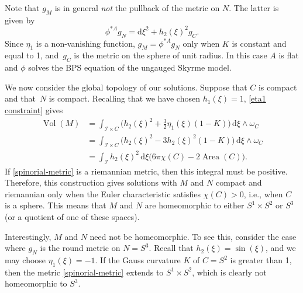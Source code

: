 \documentclass[10pt,a4paper]{amsart}
\newcommand{\II}{{\mathcal{I}}}
\newcommand{\1}{{\mathbb{1}}}
\def \d{\mathrm{d}}
\numberwithin{equation}{section}
\begin{document}
Note that $g_M$ is in general \emph{not} the pullback of the metric on $N$. The latter is given by
\begin{equation*}
\phi^{\ast A}g_N = \d\xi^2 + h_2(\xi)^{2}g_C.
\end{equation*}
Since $\eta_1$ is a non-vanishing function, $g_M=\phi^{\ast A} g_N$ only when $K$ is constant and equal to 1, and~$g_C$ is the metric on the sphere of unit radius. In this case $A$ is flat and $\phi$ solves the BPS equation of the ungauged Skyrme model.

We now consider the global topology of our solutions. Suppose that $C$ is compact and that~$N$ is compact. Recalling that we have chosen $h_1(\xi)=1$, \eqref{eta1 constraint} gives
\begin{equation*}
\begin{aligned}
\operatorname{Vol}(M)&=
\int_{\II\times C}\bigl(h_2(\xi)^{2}+\tfrac32\eta_1(\xi)(1-K)\bigr)\,\d\xi\wedge\omega_C \\
&= \int_{\II\times C}\bigl(h_2(\xi)^{2}-3h_2(\xi)^2(1-K)\bigr)\,\d\xi\wedge\omega_C \\
&= \int_{\II}h_2(\xi)^{2}\,\d\xi\bigl(6\pi\chi(C)-2\operatorname{Area}(C)\bigr).
\end{aligned}
\end{equation*}
If \eqref{spinorial-metric} is a riemannian metric, then this integral must be positive. Therefore, this construction gives solutions with $M$ and $N$ compact and riemannian only when the Euler characteristic satisfies $\chi(C)>0$, i.e., when $C$ is a sphere. This means that $M$ and $N$ are homeomorphic to either $S^1\times S^2$ or $S^3$ (or a quotient of one of these spaces).

Interestingly, $M$ and $N$ need not be homeomorphic. To see this, consider the case where $g_N$ is the round metric on $N=S^3$. Recall that $h_2(\xi)=\sin(\xi)$, and we may choose $\eta_1(\xi)=-1$. If the Gauss curvature $K$ of $C=S^2$ is greater than 1, then the metric \eqref{spinorial-metric} extends to $S^1\times S^2$, which is clearly not homeomorphic to $S^3$.
\end{document}
